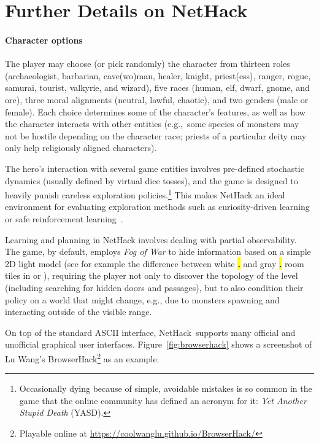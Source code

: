 \documentclass{article}
\newcommand{\nethack}{NetHack}
\newcommand{\Tile}{{\bf\ttfamily\color{nethack_white}\sethlcolor{black}\hl{.}}}
\newcommand{\HiddenTile}{{\bf\ttfamily\color{nethack_light_gray}\sethlcolor{black}\hl{.}}}
\begin{document}



\clearpage{}

\appendix \onecolumn

\section{Further Details on NetHack}
\label{sec:moreaboutnethack}

\paragraph{Character options}
The player may choose (or pick randomly) the character from thirteen roles (archaeologist, barbarian, cave(wo)man, healer, knight, priest(ess), ranger, rogue, samurai, tourist, valkyrie, and wizard), five races
(human, elf, dwarf, gnome, and orc), three moral alignments (neutral, lawful, chaotic), and two genders
(male or female). Each choice determines
some of the character's features, as well as how the character
interacts with other entities (e.g.,~some species of monsters may not
be hostile depending on the character race; priests of a particular
deity may only help religiously aligned characters).

The hero's interaction with several game entities
involves pre-defined stochastic dynamics (usually defined by virtual
dice tosses), and the game is designed to heavily punish careless
exploration policies.\footnote{Occasionally dying because of simple,
  avoidable mistakes is so common in the game that the online
  community has defined an acronym for it: \emph{Yet Another Stupid
    Death} (YASD).} This makes NetHack an ideal environment
for evaluating exploration methods such as curiosity-driven learning
\citep{pathak2017curiosity, DBLP:conf/iclr/BurdaEPSDE19} or
safe reinforcement learning~\citep{garcia2015comprehensive}.


Learning and planning in NetHack involves dealing with partial observability. The game, by default, employs \emph{Fog of War} to hide information based on a simple 2D light model (see for example
the difference between white \Tile{} and gray \HiddenTile{} room tiles
in  or ), requiring the player not
only to discover the
topology of the level (including searching for hidden doors and
passages), but to also condition their policy on a world that might
change, e.g., due to monsters spawning and interacting outside of the
visible range.

On top of the standard ASCII interface, \nethack\ supports many official and unofficial graphical user interfaces. Figure~\ref{fig:browserhack} shows a screenshot of Lu Wang's BrowserHack\footnote{Playable online at \url{https://coolwanglu.github.io/BrowserHack/}} as an example.
\end{document}
